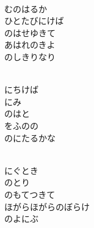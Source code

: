 \documentclass[10pt,b5j]{tarticle} %
\begin{document}
\begin{enumerate}
\begin{minipage}[c]{\blocksize}
        \vspace{\linespace}
        \item~\\
        むのはるか\\
        ひとたびにけば\\
        のはせゆきて\\
        あはれのきよ\\
        のしきりなり
        
    \end{minipage}
    \begin{minipage}[c]{\blocksize}
        
        \vspace{\linespace}
        \item~\\
        にちけば\\
        にみ\\
        のはと\\
        をふのの\\
        のにたるかな
        
    \end{minipage}
    \begin{minipage}[c]{\blocksize}
        
        \vspace{\linespace}
        \item~\\
        にぐとき\\
        のとり\\
        のもてつきて\\
        ほがらほがらのぼらけ\\
        のよにぶ
        

\end{minipage}
\end{enumerate}
\end{document}
